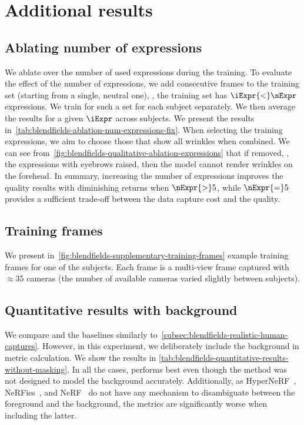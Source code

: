   
\section{Additional results}
  \subsection{Ablating number of expressions}
    We ablate over the number of used expressions during the training.
    To evaluate the effect of the number of expressions, we add consecutive
    frames to the training set (starting from a single, neutral one), \ie, the
    training set has $\iExpr{<}\nExpr$ expressions.
    We train \blendfields for such a set for each subject separately.
    We then average the results for a given $\iExpr$ across subjects.
    We present the results
    in~\cref{tab:blendfields-ablation-num-expressions-fix}.
    When selecting the training expressions, we aim to choose those that show
    all wrinkles when combined.
    We can see from~\cref{fig:blendfields-qualitative-ablation-expressions}
    that if removed, \eg, the expressions with eyebrows raised, then the model
    cannot render wrinkles on the forehead.
    In summary, increasing the number of expressions improves the quality
    results with diminishing returns when $\nExpr{>}5$, while $\nExpr{=}5$
    provides a sufficient trade-off between the data capture cost and the
    quality.

    
  \subsection{Training frames}
    We present in~\cref{fig:blendfields-supplementary-training-frames} example
    training frames for one of the subjects.
    Each frame is a multi-view frame captured with ${\approx} 35$ cameras (the
    number of available cameras varied slightly between subjects).

    
  \subsection{Quantitative results with background}
    We compare \blendfields and the baselines similarly
    to~\cref{subsec:blendfields-realistic-human-captures}.
    However, in this experiment, we deliberately include the background in
    metric calculation.
    We show the results in
    \cref{tab:blendfields-quantitative-results-without-masking}.
    In all the cases, \blendfields performs best even though the method was
    not designed to model the background accurately.
    Additionally, as HyperNeRF~\cite{park2021hypernerf},
    NeRFies~\cite{park2021nerfies}, and NeRF~\cite{mildenhall2020nerf} do not
    have any mechanism to disambiguate between the foreground and the
    background, the metrics are significantly worse when including the latter.

